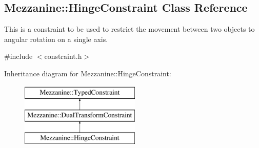 \hypertarget{classMezzanine_1_1HingeConstraint}{
\subsection{Mezzanine::HingeConstraint Class Reference}
\label{classMezzanine_1_1HingeConstraint}
}


This is a constraint to be used to restrict the movement between two objects to angular rotation on a single axis.  




{\ttfamily \#include $<$constraint.h$>$}

Inheritance diagram for Mezzanine::HingeConstraint:\begin{figure}[H]
\begin{center}
\leavevmode
\includegraphics[height=3.000000cm]{classMezzanine_1_1HingeConstraint}
\end{center}
\end{figure}
